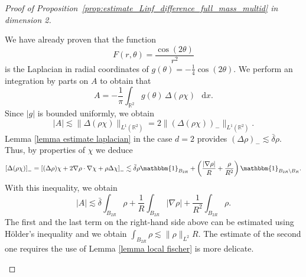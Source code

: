 \documentclass[11pt,a4paper]{article}
\numberwithin{equation}{section}
\newcommand{\R}{{\mathbb{R}}}
\theoremstyle{plain}
\theoremstyle{remark}
\newcommand {\f}{\frac}
\newcommand{\diff}{\mathop{}\!\mathrm{d}}
\newcommand{\step}[1][]{%
  \if\relax\detokenize{#1}\relax
    \def\thisstep{.}%
  \else
    \def\thisstep{: \protect #1.}%
  \fi
  \item}
\begin{document}
\begin{proof}[Proof of Proposition~\ref{prop:estimate_Linf_difference_full_mass_multid} in dimension 2]
\begin{enumeratesteps}
\step[An estimate for $A$]
We have already proven that the function
\[
F(r,\theta) 
= \f{\cos(2\theta)}{r^2}
\]
is the Laplacian in radial coordinates of 
$\displaystyle g(\theta) = -\f{1}{4}\cos(2\theta).$
We perform an integration by parts on $A$ to obtain that 
$$
    A = -\f{1}{\pi}\int_{\R^2} g(\theta)\, \Delta (\rho\chi)\, \diff x .
$$
Since $|g|$ is bounded uniformly, we obtain 
\[
    |A| \lesssim \|\Delta (\rho\chi)\|_{L^1(\R^2)}=2\|(\Delta (\rho\chi))_-\|_{L^1(\R^2)}.
\]
Lemma \ref{lemma estimate laplacian} in the case $d=2$ provides $
(\Delta\rho)_{-} \lesssim \bar\delta\rho
$. Thus, by properties of $\chi$ we deduce
$$
    \left[\Delta(\rho\chi)\right]_{-} = \left[(\Delta \rho)\chi + 2\nabla\rho\cdot\nabla \chi + \rho\Delta\chi \right]_{-}\lesssim \bar\delta\rho \mathbbm{1}_{B_{2R}} + \left(\f{|\nabla \rho|}{R} + \f{\rho}{R^2}\right) \mathbbm{1}_{B_{2R}\setminus B_{R}}.
$$
With this inequality, we obtain 
$$
    |A|\lesssim \bar\delta\int_{B_{2R}} \rho + \f{1}{R} \int_{B_{2R}}|\nabla\rho|+ \f{1}{R^{2}} \int_{B_{2R}}\rho.
$$
The first and the last term on the right-hand side above can be estimated using H\"older's inequality and we obtain $\int_{B_{2R}} \rho\lesssim \|\rho\|_{L^2} R$. The estimate of the second one requires the use of Lemma \ref{lemma local fischer} is more delicate.
%
%
%
%

\end{enumeratesteps}
\end{proof}
\end{document}
